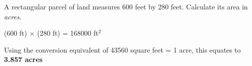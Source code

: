 

A rectangular parcel of land measures 600 feet by 280 feet.  Calculate its area in {\it acres}.







(600 ft) $\times$ (280 ft) = 168000 ft$^{2}$
 
\vskip 10pt

Using the conversion equivalent of 43560 square feet = 1 acre, this equates to {\bf 3.857 acres}











